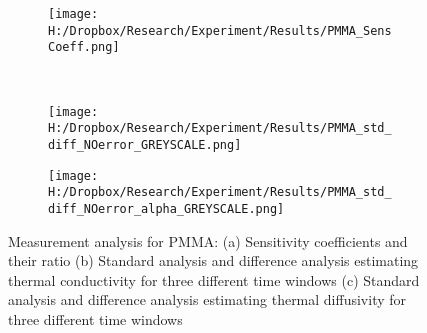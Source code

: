 \documentclass[12pt]{report}
\begin{document}
\begin{comment}

\begin{table}


\begin{tabular}{|l|c|c|c|}

\hline
& PMMA & XPS & Straw  \tabularnewline

\hline

\(\approx t_0\) {[}\(s\){]} & \(100\) & \(50\) & \(80\)\tabularnewline

\hline

\(\approx t_{max}\){[}\(s\){]} & \(390\) & \(395\) &
\(335\)\tabularnewline

\hline

\end{tabular}
\caption[Table caption text]{Time window chosen for parameter estimation for the three different samples} 

\end{table}
\end{comment}



\begin{figure}
\begin{subfigure}{1\textwidth}
\centering
\texttt{[image: H:/Dropbox/Research/Experiment/Results/PMMA\_SensCoeff.png]}
\caption{}
\end{subfigure}\\
\begin{subfigure}{.5\textwidth}
\centering
\texttt{[image: H:/Dropbox/Research/Experiment/Results/PMMA\_std\_diff\_NOerror\_GREYSCALE.png]}
\caption{}
\end{subfigure}\hfill
\begin{subfigure}{.5\textwidth}
\centering
\texttt{[image: H:/Dropbox/Research/Experiment/Results/PMMA\_std\_diff\_NOerror\_alpha\_GREYSCALE.png]}
\caption{}
\end{subfigure}
\caption{Measurement analysis for PMMA: (a) Sensitivity coefficients and their ratio (b) Standard analysis and difference analysis estimating thermal conductivity for three different time windows (c) Standard analysis and difference analysis estimating thermal diffusivity for three different time windows}
\label{pic:pmma1}
\end{figure}
\end{document}
